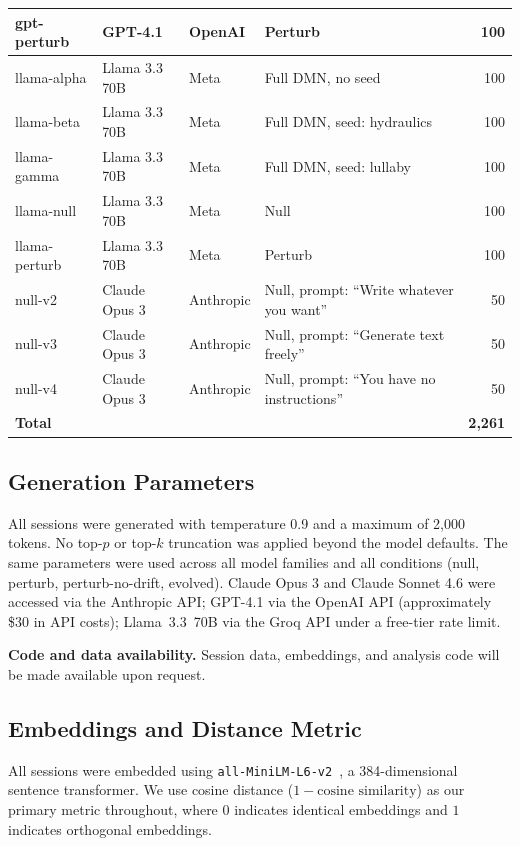\documentclass{article}
\begin{document}
\begin{table}[h]
\begin{tabular}{llllr}
gpt-perturb   & GPT-4.1         & OpenAI   & Perturb                    & 100 \\
\midrule
llama-alpha   & Llama 3.3 70B   & Meta     & Full DMN, no seed          & 100 \\
llama-beta    & Llama 3.3 70B   & Meta     & Full DMN, seed: hydraulics & 100 \\
llama-gamma   & Llama 3.3 70B   & Meta     & Full DMN, seed: lullaby    & 100 \\
llama-null    & Llama 3.3 70B   & Meta     & Null                       & 100 \\
llama-perturb & Llama 3.3 70B   & Meta     & Perturb                    & 100 \\
\midrule
null-v2       & Claude Opus 3   & Anthropic & Null, prompt: ``Write whatever you want'' & 50 \\
null-v3       & Claude Opus 3   & Anthropic & Null, prompt: ``Generate text freely''    & 50 \\
null-v4       & Claude Opus 3   & Anthropic & Null, prompt: ``You have no instructions'' & 50 \\
\midrule
\textbf{Total} & & & & \textbf{2,261} \\
\bottomrule
\end{tabular}
\end{table}

\subsection{Generation Parameters}

All sessions were generated with temperature 0.9 and a maximum of 2,000 tokens. No top-$p$ or top-$k$ truncation was applied beyond the model defaults. The same parameters were used across all model families and all conditions (null, perturb, perturb-no-drift, evolved). Claude Opus 3 and Claude Sonnet 4.6 were accessed via the Anthropic API; GPT-4.1 via the OpenAI API (approximately \$30 in API costs); Llama~3.3~70B via the Groq API under a free-tier rate limit.

\textbf{Code and data availability.} Session data, embeddings, and analysis code will be made available upon request.

\subsection{Embeddings and Distance Metric}

All sessions were embedded using \texttt{all-MiniLM-L6-v2}~\citep{reimers2019sentencebert},
a 384-dimensional sentence transformer. We use cosine distance
($1 - \text{cosine similarity}$) as our primary metric throughout, where
$0$ indicates identical embeddings and $1$ indicates orthogonal embeddings.
\end{document}
